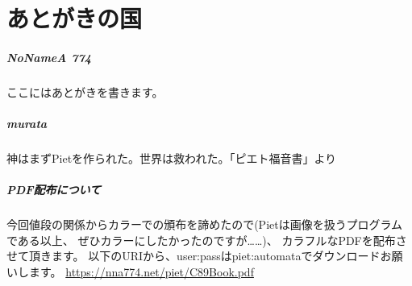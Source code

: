 \chapter[あとがきの国]{あとがきの国}

\paragraph{NoNameA 774}

ここにはあとがきを書きます。

\paragraph{murata}

神はまずPietを作られた。世界は救われた。「ピエト福音書」より

\paragraph{PDF配布について}

今回値段の関係からカラーでの頒布を諦めたので(Pietは画像を扱うプログラムである以上、
ぜひカラーにしたかったのですが……)、
カラフルなPDFを配布させて頂きます。
以下のURIから、user:passはpiet:automataでダウンロードお願いします。
\url{https://nna774.net/piet/C89Book.pdf}

